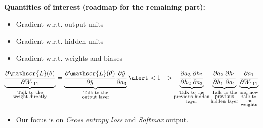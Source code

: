 \savestack{\nnhiddencompone}{}
\savestack{\nnhiddencomp}{}
\savestack{\nnhiddensimp}{}

\begin{frame}
\end{frame}

\begin{frame}
  \begin{overlayarea}{\textwidth}{\textheight}
    \textbf{Quantities of interest (roadmap for the remaining part):}
    \begin{itemize}
      \justifying
      \item Gradient w.r.t. output units
      \item \alert<1->{Gradient w.r.t. hidden units}
      \item Gradient w.r.t. weights and biases
    \end{itemize}

    \begin{align*}
      \underbrace{\frac{\partial \mathscr{L}(\theta)}{\partial W_{111}}}_
      {\substack{\text{Talk to the}\\ \text{weight directly}}}
      =
      \underbrace{\frac{\partial \mathscr{L}(\theta)}{\partial \hat{y}} \frac{\partial \hat{y}}{\partial a_{3}}}_
        {\substack{\text{Talk to the} \\ \text{output layer}}}
      \alert<1->{\underbrace{\frac{\partial a_{3}}{\partial h_{2}} \frac{\partial h_{2}}{\partial a_{2}}}_
        {\substack{\text{Talk to the} \\ \text{previous hidden} \\ \text{layer}}}
        \underbrace{\frac{\partial a_{2}}{\partial h_{1}} \frac{\partial h_{1}}{\partial a_{1}}}_
        {\substack{\text{Talk to the} \\ \text{previous} \\ \text{hidden layer}}}}
      \underbrace{\frac{\partial a_{1}}{\partial W_{111}}}_
      {\substack{\text{and now} \\ \text{talk to} \\ \text{the} \\ \text{weights}}}
    \end{align*}

    \begin{itemize}
      \justifying
      \item<1-> Our focus is on \textit{Cross entropy loss} and \textit{Softmax} output.
    \end{itemize}
  \end{overlayarea}
\end{frame}

